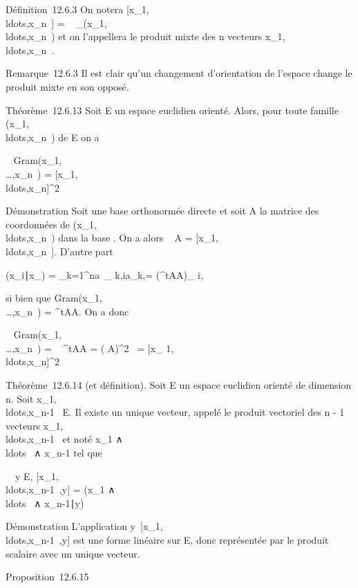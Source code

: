 \documentclass[]{article}
\begin{document}
Définition~12.6.3 On notera
{[}x\_1,\\ldots,x\_n~{]}
= ~
\_(x\_1,\\ldots,x\_n~)
et on l'appellera le produit mixte des n vecteurs
x\_1,\\ldots,x\_n~.

Remarque~12.6.3 Il est clair qu'un changement d'orientation de l'espace
change le produit mixte en son opposé.

Théorème~12.6.13 Soit E un espace euclidien orienté. Alors, pour toute
famille
(x\_1,\\ldots,x\_n~)
de E on a

~
Gram(x\_1,\\\ldots,x\_n~)
=
{[}x\_1,\\ldots,x\_n{]}^2~

Démonstration Soit  une base orthonormée directe et soit A la matrice
des coordonnées de
(x\_1,\\ldots,x\_n~)
dans la base . On a alors
~ A =
{[}x\_1,\\ldots,x\_n~{]}.
D'autre part

(x\_i∣x\_\jmath) =
\sum \_k=1^na~\_
k,ia\_k,\jmath = (^tAA)\_ i,\jmath

si bien que
Gram(x\_1,\\\ldots,x\_n~)
= ^tAA. On a donc

~
Gram(x\_1,\\\ldots,x\_n~)
= ~
^tAA =
( A)^2~
= {[}x\_
1,\\ldots,x\_n{]}^2~

Théorème~12.6.14 (et définition). Soit E un espace euclidien orienté de
dimension n. Soit
x\_1,\\ldots,x\_n-1~
\in E. Il existe un unique vecteur, appelé le produit vectoriel des n - 1
vecteurs
x\_1,\\ldots,x\_n-1~
et noté x\_1
∧\\ldots~ ∧
x\_n-1 tel que

\forall~~y \in E,
{[}x\_1,\\ldots,x\_n-1~,y{]}
= (x\_1
∧\\ldots~ ∧
x\_n-1∣y)

Démonstration L'application
y\mapsto~{[}x\_1,\\ldots,x\_n-1~,y{]}
est une forme linéaire sur E, donc représentée par le produit scalaire
avec un unique vecteur.

Proposition~12.6.15
\end{document}
